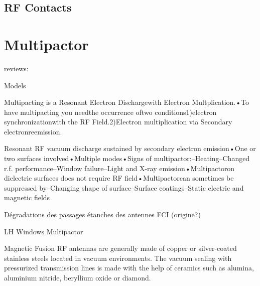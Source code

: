 {%
\subsection{RF Contacts}\label{sec:RF_contacts}

\cite{agarici1997}


\section{Multipactor}\label{sec:Multipactor}
reviews:\cite{kishek1998}

Models\cite{vaughan1989}

Multipacting is a Resonant Electron Dischargewith Electron Multplication.•To have multipacting you needthe occurrence oftwo conditions1)electron synchronizationwith the RF Field.2)Electron multiplication via Secondary electronreemission.

Resonant RF vacuum discharge sustained by secondary electron emission•One or two surfaces involved•Multiple modes•Signs of multipactor:–Heating–Changed r.f. performance–Window failure–Light and X-ray emission•Multipactoron dielectric surfaces does not require RF field•Multipactorcan sometimes be suppressed by–Changing shape of surface–Surface coatings–Static electric and magnetic fields

Dégradations des passages étanches des antennes FCI (origine?)



LH Windows Multipactor



Magnetic Fusion RF antennas are generally made of copper or silver-coated stainless steels located in vacuum environments. The vacuum sealing with pressurized transmission lines is made with the help of ceramics such as alumina, aluminium nitride, beryllium oxide or diamond. 

}

